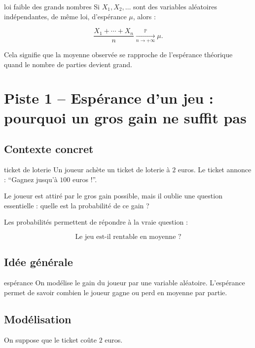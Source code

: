 \documentclass[11pt,a4paper]{article}
\begin{document}
\begin{prepa}{loi faible des grands nombres}
Si $X_1,X_2,\dots$ sont des variables aléatoires indépendantes, de même loi, d'espérance $\mu$, alors :

\[
\frac{X_1+\cdots+X_n}{n}
\xrightarrow[n\to+\infty]{\mathbb{P}}
\mu.
\]

Cela signifie que la moyenne observée se rapproche de l'espérance théorique quand le nombre de parties devient grand.
\end{prepa}

\newpage

\section{Piste 1 -- Espérance d'un jeu : pourquoi un gros gain ne suffit pas}

\subsection{Contexte concret}

\begin{contexte}{ticket de loterie}
Un joueur achète un ticket de loterie à $2$ euros. Le ticket annonce : ``Gagnez jusqu'à $100$ euros !''.

Le joueur est attiré par le gros gain possible, mais il oublie une question essentielle : quelle est la probabilité de ce gain ?

Les probabilités permettent de répondre à la vraie question :

\[
\text{Le jeu est-il rentable en moyenne ?}
\]
\end{contexte}

\subsection{Idée générale}

\begin{idee}{espérance}
On modélise le gain du joueur par une variable aléatoire. L'espérance permet de savoir combien le joueur gagne ou perd en moyenne par partie.
\end{idee}

\subsection{Modélisation}

On suppose que le ticket coûte $2$ euros.
\end{document}
